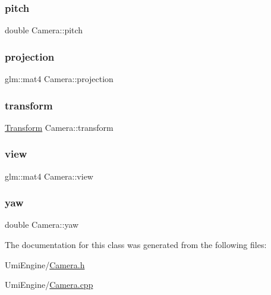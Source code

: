 \subsubsection{\texorpdfstring{pitch}{pitch}}
{\footnotesize\ttfamily double Camera\+::pitch\hspace{0.3cm}{\ttfamily [protected]}}

\mbox{\label{class_camera_a43555a0ae83f9ec696ee257e5fd48cf2}} 
\subsubsection{\texorpdfstring{projection}{projection}}
{\footnotesize\ttfamily glm\+::mat4 Camera\+::projection\hspace{0.3cm}{\ttfamily [protected]}}

\mbox{\label{class_camera_ad5cea63239e1519c1fe7d414f5e047a8}} 
\subsubsection{\texorpdfstring{transform}{transform}}
{\footnotesize\ttfamily \mbox{\hyperlink{class_transform}{Transform}} Camera\+::transform}

\mbox{\label{class_camera_add93fedd6b9a6a6e2c784aeda624de83}} 
\subsubsection{\texorpdfstring{view}{view}}
{\footnotesize\ttfamily glm\+::mat4 Camera\+::view\hspace{0.3cm}{\ttfamily [protected]}}

\mbox{\label{class_camera_a54536224732656e8f4a419cf11662d3e}} 
\subsubsection{\texorpdfstring{yaw}{yaw}}
{\footnotesize\ttfamily double Camera\+::yaw\hspace{0.3cm}{\ttfamily [protected]}}



The documentation for this class was generated from the following files\+:\begin{DoxyCompactItemize}
\item 
Umi\+Engine/\mbox{\hyperlink{_camera_8h}{Camera.\+h}}\item 
Umi\+Engine/\mbox{\hyperlink{_camera_8cpp}{Camera.\+cpp}}\end{DoxyCompactItemize}
